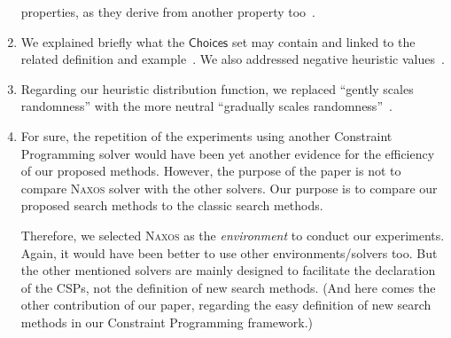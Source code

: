 \documentclass{ws-ijait}
\begin{document}
\begin{enumerate}
        properties, as they derive from another property
        too~.
  \item We explained briefly what the $\mathsf{Choices}$ set
        may contain and linked to the related definition and
        example~. We also addressed negative
        heuristic values~.
  \item Regarding our heuristic distribution function, we
        replaced ``gently scales randomness'' with the more
        neutral ``gradually scales
        randomness''~.
  \item For sure, the repetition of the experiments using
        another Constraint Programming solver would have
        been yet another evidence for the efficiency of our
        proposed methods. However, the purpose of the paper
        is not to compare \textsc{Naxos} solver with the
        other solvers. Our purpose is to compare our
        proposed search methods to the classic search
        methods.

        Therefore, we selected \textsc{Naxos} as the
        \emph{environment} to conduct our experiments.
        Again, it would have been better to use other
        environments\slash solvers too. But the other
        mentioned solvers are mainly designed to facilitate
        the declaration of the CSPs, not the definition of
        new search methods. (And here comes the other
        contribution of our paper, regarding the easy
        definition of new search methods in our Constraint
        Programming framework.)
\end{enumerate}
\end{document}
